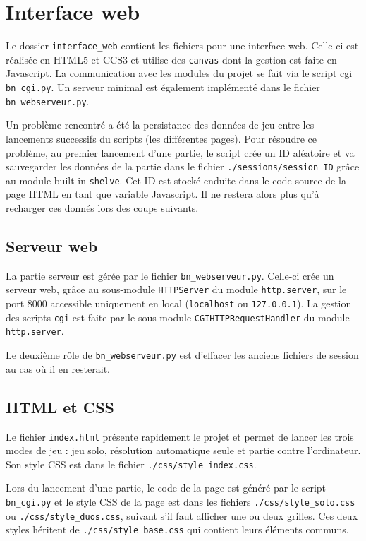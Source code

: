 \chapter{Interface web}

Le dossier \texttt{interface\_web} contient les fichiers pour une interface web. Celle-ci est réalisée en HTML5 et CCS3 et utilise des \texttt{canvas} dont la gestion est faite en Javascript. La communication avec les modules du projet se fait via le script cgi \texttt{bn\_cgi.py}. Un serveur minimal est également implémenté dans le fichier \texttt{bn\_webserveur.py}.

Un problème rencontré a été la persistance des données de jeu entre les lancements successifs du scripts (les différentes pages). Pour résoudre ce problème, au premier lancement d'une partie, le script crée un ID aléatoire et va sauvegarder les données de la partie dans le fichier \texttt{./sessions/session\_ID} grâce au module built-in \texttt{shelve}. Cet ID est stocké enduite dans le code source de la page HTML en tant que variable Javascript. Il ne restera alors plus qu'à recharger ces donnés lors des coups suivants.

\section{Serveur web}
La partie serveur est gérée par le fichier \texttt{bn\_webserveur.py}.
Celle-ci crée un serveur web, grâce au sous-module \texttt{HTTPServer} du module  \texttt{http.server}, sur le port 8000 accessible uniquement en local (\texttt{localhost} ou \texttt{127.0.0.1}). La gestion des scripts \texttt{cgi} est faite par le sous module \texttt{CGIHTTPRequestHandler} du module \texttt{http.server}.

Le deuxième rôle de \texttt{bn\_webserveur.py} est d'effacer les anciens fichiers de session au cas où il en resterait.

\section{HTML et CSS}
Le fichier \texttt{index.html} présente rapidement le projet et permet de lancer les trois modes de jeu : jeu solo, résolution automatique seule et partie contre l'ordinateur. Son style CSS est dans le fichier \texttt{./css/style\_index.css}.

Lors du lancement d'une partie, le code de la page est généré par le script \texttt{bn\_cgi.py} et le style CSS de la page est dans les fichiers \texttt{./css/style\_solo.css} ou \texttt{./css/style\_duos.css}, suivant s'il faut afficher une ou deux grilles. Ces deux styles héritent de \texttt{./css/style\_base.css} qui contient leurs éléments communs.

